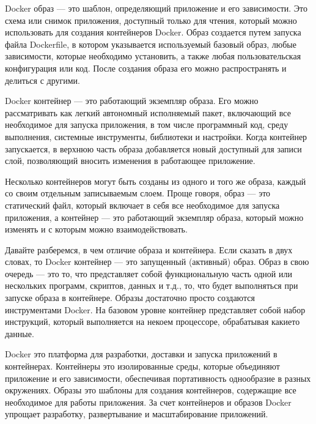 \documentclass[letterpaper,10pt,russian]{sphinxmanual}
\begin{document}
\sphinxAtStartPar
Docker образ — это шаблон, определяющий приложение и его зависимости. Это схема или снимок приложения, доступный только для чтения, который можно использовать для создания контейнеров Docker. Образ создается путем запуска файла Dockerfile, в котором указывается используемый базовый образ, любые зависимости, которые необходимо установить, а также любая пользовательская конфигурация или код. После создания образа его можно распространять и делиться с другими.

\sphinxAtStartPar
Docker контейнер — это работающий экземпляр образа. Его можно рассматривать как легкий автономный исполняемый пакет, включающий все необходимое для запуска приложения, в том числе программный код, среду выполнения, системные инструменты, библиотеки и настройки. Когда контейнер запускается, в верхнюю часть образа добавляется новый доступный для записи слой, позволяющий вносить изменения в работающее приложение.

\sphinxAtStartPar
Несколько контейнеров могут быть созданы из одного и того же образа, каждый со своим отдельным записываемым слоем. Проще говоря, образ — это статический файл, который включает в себя все необходимое для запуска приложения, а контейнер — это работающий экземпляр образа, который можно изменять и с которым можно взаимодействовать.

\sphinxAtStartPar
Давайте разберемся, в чем отличие образа и контейнера. Если сказать в двух словах, то Docker контейнер — это запущенный (активный) образ. Образ в свою очередь — это то, что представляет собой функциональную часть одной или нескольких программ, скриптов, данных и т.д., то, что будет выполняться при запуске образа в контейнере. Образы достаточно просто создаются инструментами Docker. На базовом уровне контейнер представляет собой набор инструкций, который выполняется на некоем процессоре, обрабатывая какие\sphinxhyphen{}то данные.

\sphinxAtStartPar
{}

\sphinxAtStartPar
Docker \sphinxhyphen{} это платформа для разработки, доставки и запуска приложений в контейнерах. Контейнеры \sphinxhyphen{} это изолированные среды, которые объединяют приложение и его зависимости, обеспечивая портативность однообразие в разных окружениях. Образы \sphinxhyphen{} это шаблоны для создания контейнеров, содержащие все необходимое для работы приложения. За счет контейнеров и образов Docker упрощает разработку, развертывание и масштабирование приложений.
\end{document}
